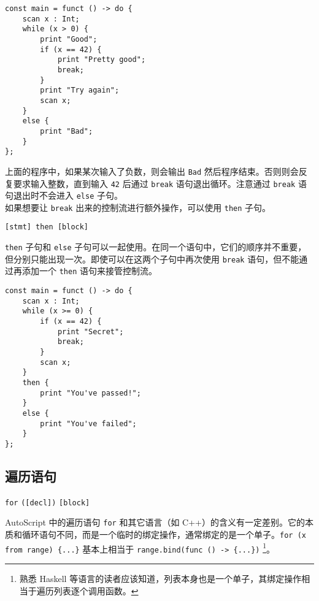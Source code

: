 \begin{lstlisting}
const main = funct () -> do {
    scan x : Int;
    while (x > 0) {
        print "Good";
        if (x == 42) {
            print "Pretty good";
            break;
        }
        print "Try again";
        scan x;
    }
    else {
        print "Bad";
    }
};
\end{lstlisting}

上面的程序中，如果某次输入了负数，则会输出 \lstinline!Bad! 然后程序结束。否则则会反复要求输入整数，直到输入 \lstinline!42! 后通过 \lstinline!break! 语句退出循环。注意通过 \lstinline!break! 语句退出时不会进入 \lstinline!else! 子句。 \\

如果想要让 \lstinline!break! 出来的控制流进行额外操作，可以使用 \lstinline!then! 子句。

\begin{grammar}
    \lstinline![stmt] then [block]!
\end{grammar}

\lstinline!then! 子句和 \lstinline!else! 子句可以一起使用。在同一个语句中，它们的顺序并不重要，但分别只能出现一次。即使可以在这两个子句中再次使用 \lstinline!break! 语句，但不能通过再添加一个 \lstinline!then! 语句来接管控制流。

\begin{lstlisting}
const main = funct () -> do {
    scan x : Int;
    while (x >= 0) {
        if (x == 42) {
            print "Secret";
            break;
        }
        scan x;
    }
    then {
        print "You've passed!";
    }
    else {
        print "You've failed";
    }
};
\end{lstlisting}

\subsection{遍历语句}

\begin{grammar}
	\lstinline!for! \texttt{([decl])} \texttt{[block]}
\end{grammar}

AutoScript 中的遍历语句 \lstinline!for! 和其它语言（如 C++）的含义有一定差别。它的本质和循环语句不同，而是一个临时的绑定操作，通常绑定的是一个单子。\lstinline!for (x from range) {...}! 基本上相当于 \lstinline!range.bind(func () -> {...})! \footnote{熟悉 Haskell 等语言的读者应该知道，列表本身也是一个单子，其绑定操作相当于遍历列表逐个调用函数。}。

